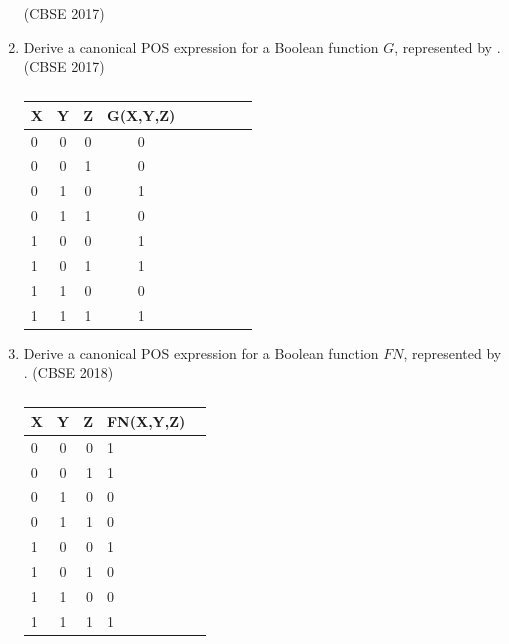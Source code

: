 \begin{enumerate}[label=\arabic*.,ref=\theenumi]
\hfill (CBSE 2017)
	\item Derive a canonical POS expression for a Boolean function $G$, represented by 
.
\label{prob:2017/c/6/c}
\hfill (CBSE 2017)
		\begin{table}[H]
 \begin{center}
    \begin{tabular}{|l|c|c|c|c|c|c|c|c|} \hline 
  \textbf{X}& \textbf{Y} & \textbf{Z} &\textbf{G(X,Y,Z)} \\
 \hline
 0&0&0&0\\ \hline
0&0&1&0 \\ \hline
0&1&0&1\\ \hline
0&1&1&0  \\ \hline
1&0&0&1\\ \hline
1&0&1&1\\ \hline
1&1&0&0\\ \hline
1&1&1&1\\ \hline
\end{tabular}   
\end{center}
\caption{}
\label{tab:2017/c/6/c}
\end{table}
\item Derive a canonical POS expression for a Boolean function $FN$, represented by 
.
\label{prob:2018/c/6/c}
\hfill (CBSE 2018)
		\begin{table}[H]
			\centering
\begin{tabular}{|l|c|r|l|c|}
    \hline %
      \textbf{X} & \textbf{Y} & \textbf{Z} & \textbf{FN(X,Y,Z)}\\
      \hline
      0 & 0 & 0 & 1\\
\hline
      0 & 0 & 1 & 1\\
\hline
      0 & 1 & 0 & 0\\
\hline
      0 & 1 & 1 & 0\\
\hline
      1 & 0 & 0 & 1\\
\hline
      1 & 0 & 1 & 0\\
\hline
      1 & 1 & 0 & 0\\
\hline
      1 & 1 & 1 & 1\\
      \hline      
   \end{tabular}
\caption{}
\label{tab:2018/c/6/c}
   \end{table}


\end{enumerate}
